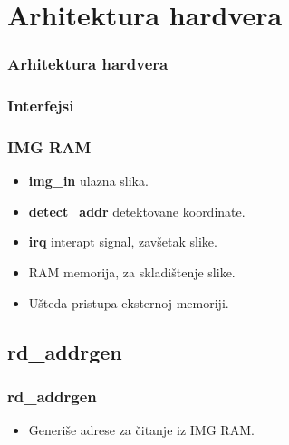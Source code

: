 \documentclass{beamer}
\begin{document}
\section{Arhitektura hardvera}

\begin{frame}
  \frametitle{Arhitektura hardvera}
  \begin{figure}[H]
    \centering{
      \resizebox{1.00\textwidth}{!}{%
        
      }}
  \end{figure}
\end{frame}

\begin{frame}
   \frametitle<1->{Interfejsi}
   \frametitle<2->{IMG RAM}

  \begin{itemize}
  \item<1-1> \textbf{img\_in} ulazna slika.
  \item<1-1> \textbf{detect\_addr} detektovane koordinate.
  \item<1-1> \textbf{irq} interapt signal, zavšetak slike.

  \item<2-2> RAM memorija, za skladištenje slike.
  \item<2-2> Ušteda pristupa eksternoj memoriji.
  \end{itemize}

  \begin{figure}[H]
    \centering{
      \resizebox{.87\textwidth}{!}{%
        
      }}
  \end{figure}
\end{frame}

\subsection{rd\_addrgen}

\begin{frame}
  \frametitle<1->{rd\_addrgen}

  \begin{itemize}
  \item<1-2> Generiše adrese za čitanje iz IMG RAM.

  \end{itemize}

  \begin{figure}[H]
    \centering
  \end{figure}

\end{frame}
\end{document}
